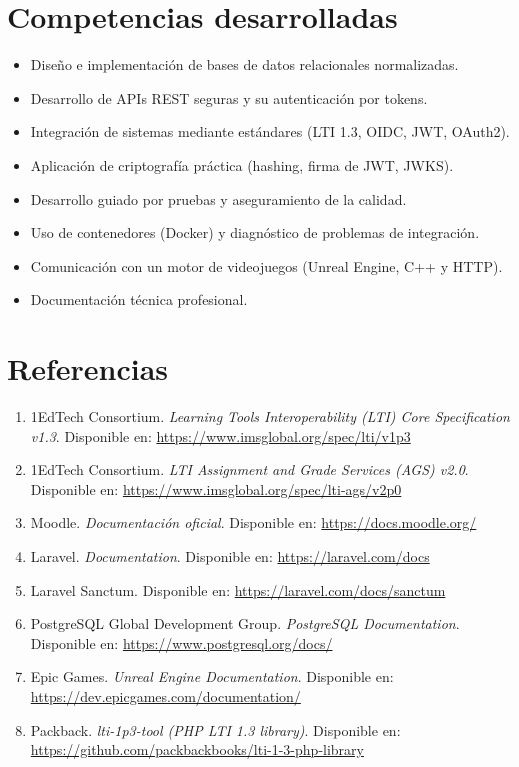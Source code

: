 \documentclass[12pt,letterpaper,oneside]{report}
\begin{document}
\chapter{Competencias desarrolladas}
\begin{itemize}[leftmargin=1.4em]
  \item Diseño e implementación de bases de datos relacionales normalizadas.
  \item Desarrollo de APIs REST seguras y su autenticación por tokens.
  \item Integración de sistemas mediante estándares (LTI 1.3, OIDC, JWT, OAuth2).
  \item Aplicación de criptografía práctica (hashing, firma de JWT, JWKS).
  \item Desarrollo guiado por pruebas y aseguramiento de la calidad.
  \item Uso de contenedores (Docker) y diagnóstico de problemas de integración.
  \item Comunicación con un motor de videojuegos (Unreal Engine, C++ y HTTP).
  \item Documentación técnica profesional.
\end{itemize}

\chapter*{Referencias}
\begin{enumerate}[leftmargin=1.6em]
  \item 1EdTech Consortium. \emph{Learning Tools Interoperability (LTI) Core
  Specification v1.3}. Disponible en: \url{https://www.imsglobal.org/spec/lti/v1p3}
  \item 1EdTech Consortium. \emph{LTI Assignment and Grade Services (AGS) v2.0}.
  Disponible en: \url{https://www.imsglobal.org/spec/lti-ags/v2p0}
  \item Moodle. \emph{Documentación oficial}. Disponible en:
  \url{https://docs.moodle.org/}
  \item Laravel. \emph{Documentation}. Disponible en: \url{https://laravel.com/docs}
  \item Laravel Sanctum. Disponible en: \url{https://laravel.com/docs/sanctum}
  \item PostgreSQL Global Development Group. \emph{PostgreSQL Documentation}.
  Disponible en: \url{https://www.postgresql.org/docs/}
  \item Epic Games. \emph{Unreal Engine Documentation}. Disponible en:
  \url{https://dev.epicgames.com/documentation/}
  \item Packback. \emph{lti-1p3-tool (PHP LTI 1.3 library)}. Disponible en:
  \url{https://github.com/packbackbooks/lti-1-3-php-library}
\end{enumerate}
\end{document}
